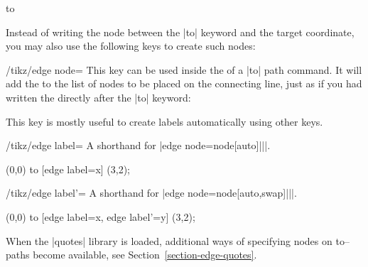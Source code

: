 \begin{pathoperation}{to}{
     }
\begin{codeexample}[]
\end{codeexample}

  Instead of writing the node between the |to| keyword and the
  target coordinate, you may also use the following keys to create
  such nodes:
  \begin{key}{/tikz/edge node=}
    This key can be used inside the  of a |to| path
    command. It will add the  to the list of
    nodes to be placed on the connecting line, just as if you had
    written the  directly after the |to|
    keyword: 
\begin{codeexample}[]
\end{codeexample}
    This key is mostly useful to create labels automatically using
    other keys.
  \end{key}
  \begin{key}{/tikz/edge label=}
    A shorthand for |edge node={node[auto]{||}}|.
\begin{codeexample}[]
\tikz \draw (0,0) to [edge label=x] (3,2);
\end{codeexample}
  \end{key}
  \begin{key}{/tikz/edge label'=}
    A shorthand for |edge node={node[auto,swap]{||}}|.
\begin{codeexample}[]
\tikz \draw (0,0) to [edge label=x, edge label'=y] (3,2);
\end{codeexample}
  \end{key}
  
  When the |quotes| library is loaded, additional ways of specifying
  nodes on to--paths become available, see Section~\ref{section-edge-quotes}.
  

\end{pathoperation}
